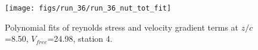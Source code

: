 \begin{figure}[H]
\centering
\texttt{[image: figs/run\_36/run\_36\_nut\_tot\_fit]}
\caption{Polynomial fits of reynolds stress and velocity gradient terms at $z/c$=8.50, $V_{free}$=24.98, station 4.}
\label{fig:run_36_nut_tot_fit}
\end{figure}


